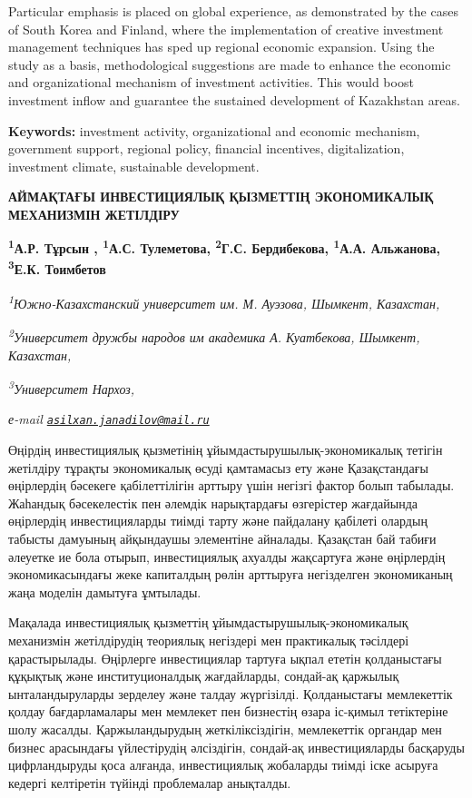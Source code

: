 Particular emphasis is placed on global experience, as demonstrated by
the cases of South Korea and Finland, where the implementation of
creative investment management techniques has sped up regional economic
expansion. Using the study as a basis, methodological suggestions are
made to enhance the economic and organizational mechanism of investment
activities. This would boost investment inflow and guarantee the
sustained development of Kazakhstan areas.

{\bfseries Keywords:} investment activity, organizational and economic
mechanism, government support, regional policy, financial incentives,
digitalization, investment climate, sustainable development.

\begin{articleheader}
{\bfseries АЙМАҚТАҒЫ ИНВЕСТИЦИЯЛЫҚ ҚЫЗМЕТТІҢ ЭКОНОМИКАЛЫҚ МЕХАНИЗМІН ЖЕТІЛДІРУ}

{\bfseries
\textsuperscript{1}А.Р. Тұрсын \textsuperscript{\envelope },
\textsuperscript{1}А.С. Тулеметова,
\textsuperscript{2}Г.С. Бердибекова,
\textsuperscript{1}А.А. Альжанова,
\textsuperscript{3}Е.К. Тоимбетов}
\end{articleheader}

\begin{affiliation}
\emph{\textsuperscript{1}Южно-Казахстанский университет им. М. Ауэзова, Шымкент, Казахстан,}

\emph{\textsuperscript{2}Университет дружбы народов им академика А. Куатбекова, Шымкент, Казахстан,}

\emph{\textsuperscript{3}Университет Нархоз,}

\emph{е-mail \href{mailto:asilxan.janadilov@mail.ru}{\nolinkurl{asilxan.janadilov@mail.ru}}}
\end{affiliation}

Өңірдің инвестициялық қызметінің ұйымдастырушылық-экономикалық тетігін
жетілдіру тұрақты экономикалық өсуді қамтамасыз ету және Қазақстандағы
өңірлердің бәсекеге қабілеттілігін арттыру үшін негізгі фактор болып
табылады. Жаһандық бәсекелестік пен әлемдік нарықтардағы өзгерістер
жағдайында өңірлердің инвестицияларды тиімді тарту және пайдалану
қабілеті олардың табысты дамуының айқындаушы элементіне айналады.
Қазақстан бай табиғи әлеуетке ие бола отырып, инвестициялық ахуалды
жақсартуға және өңірлердің экономикасындағы жеке капиталдың рөлін
арттыруға негізделген экономиканың жаңа моделін дамытуға ұмтылады.

Мақалада инвестициялық қызметтің ұйымдастырушылық-экономикалық
механизмін жетілдірудің теориялық негіздері мен практикалық тәсілдері
қарастырылады. Өңірлерге инвестициялар тартуға ықпал ететін қолданыстағы
құқықтық және институционалдық жағдайларды, сондай-ақ қаржылық
ынталандыруларды зерделеу және талдау жүргізілді. Қолданыстағы
мемлекеттік қолдау бағдарламалары мен мемлекет пен бизнестің өзара
іс-қимыл тетіктеріне шолу жасалды. Қаржыландырудың жеткіліксіздігін,
мемлекеттік органдар мен бизнес арасындағы үйлестірудің әлсіздігін,
сондай-ақ инвестицияларды басқаруды цифрландыруды қоса алғанда,
инвестициялық жобаларды тиімді іске асыруға кедергі келтіретін түйінді
проблемалар анықталды.

